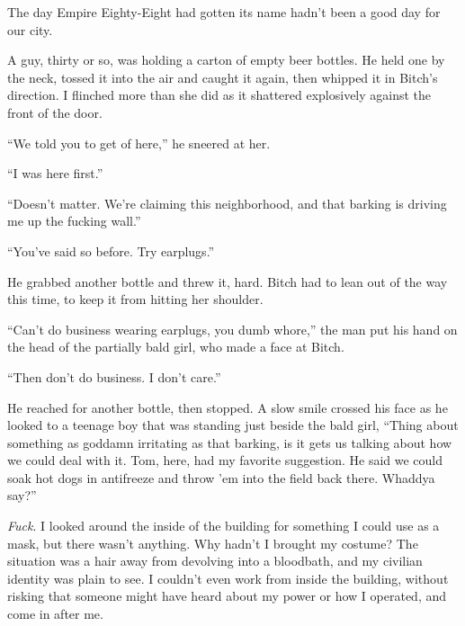 The day Empire Eighty-Eight had gotten its name hadn't been a good day for our city.



A guy, thirty or so, was holding a carton of empty beer bottles.  He held one by the neck, tossed it into the air and caught it again, then whipped it in Bitch's direction.  I flinched more than she did as it shattered explosively against the front of the door.



``We told you to get of here,'' he sneered at her.



``I was here first.''



``Doesn't matter.  We're claiming this neighborhood, and that barking is driving me up the fucking wall.''



``You've said so before.  Try earplugs.''



He grabbed another bottle and threw it, hard.  Bitch had to lean out of the way this time, to keep it from hitting her shoulder.



``Can't do business wearing earplugs, you dumb whore,'' the man put his hand on the head of the partially bald girl, who made a face at Bitch.



``Then don't do business.  I don't care.''



He reached for another bottle, then stopped.  A slow smile crossed his face as he looked to a teenage boy that was standing just beside the bald girl,  ``Thing about something as goddamn irritating as that barking, is it gets us talking about how we could deal with it.  Tom, here, had my favorite suggestion.  He said we could soak hot dogs in antifreeze and throw 'em into the field back there.  Whaddya say?''



\emph{Fuck}. I looked around the inside of the building for something I could use as a mask, but there wasn't anything.  Why hadn't I brought my costume?  The situation was a hair away from devolving into a bloodbath, and my civilian identity was plain to see.  I couldn't even work from inside the building, without risking that someone might have heard about my power or how I operated, and come in after me.



